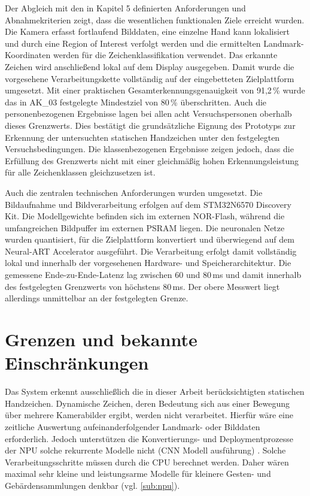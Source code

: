 Der Abgleich mit den in Kapitel 5 definierten Anforderungen und Abnahmekriterien zeigt, dass die wesentlichen funktionalen Ziele erreicht wurden. Die Kamera erfasst fortlaufend Bilddaten, eine einzelne Hand kann lokalisiert und durch eine Region of Interest verfolgt werden und die ermittelten Landmark-Koordinaten werden für die Zeichenklassifikation verwendet. Das erkannte Zeichen wird anschließend lokal auf dem Display ausgegeben. Damit wurde die vorgesehene Verarbeitungskette vollständig auf der eingebetteten Zielplattform umgesetzt. Mit einer praktischen Gesamterkennungsgenauigkeit von 91,2\,\% wurde das in AK\_03 festgelegte Mindestziel von 80\,\% überschritten. Auch die personenbezogenen Ergebnisse lagen bei allen acht Versuchspersonen oberhalb dieses Grenzwerts. Dies bestätigt die grundsätzliche Eignung des Prototyps zur Erkennung der untersuchten statischen Handzeichen unter den festgelegten Versuchsbedingungen. Die klassenbezogenen Ergebnisse zeigen jedoch, dass die Erfüllung des Grenzwerts nicht mit einer gleichmäßig hohen Erkennungsleistung für alle Zeichenklassen gleichzusetzen ist.

Auch die zentralen technischen Anforderungen wurden umgesetzt. Die Bildaufnahme und Bildverarbeitung erfolgen auf dem STM32N6570 Discovery Kit. Die Modellgewichte befinden sich im externen NOR-Flash, während die umfangreichen Bildpuffer im externen PSRAM liegen. Die neuronalen Netze wurden quantisiert, für die Zielplattform konvertiert und überwiegend auf dem Neural-ART Accelerator ausgeführt. Die Verarbeitung erfolgt damit vollständig lokal und innerhalb der vorgesehenen Hardware- und Speicherarchitektur. Die gemessene Ende-zu-Ende-Latenz lag zwischen 60 und 80\,ms und damit innerhalb des festgelegten Grenzwerts von höchstens 80\,ms. Der obere Messwert liegt allerdings unmittelbar an der festgelegten Grenze.

\section{Grenzen und bekannte Einschränkungen}\label{sec:grenzen}

Das System erkennt ausschließlich die in dieser Arbeit berücksichtigten statischen Handzeichen. Dynamische Zeichen, deren Bedeutung sich aus einer Bewegung über mehrere Kamerabilder ergibt, werden nicht verarbeitet. Hierfür wäre eine zeitliche Auswertung aufeinanderfolgender Landmark- oder Bilddaten erforderlich. Jedoch unterstützen die Konvertierungs- und Deploymentprozesse der NPU solche rekurrente Modelle nicht (CNN Modell ausführung) \cite{STNeuralARTNPU}. Solche Verarbeitungsschritte müssen durch die CPU berechnet werden. Daher wären maximal sehr kleine und leistungsarme Modelle für kleinere Gesten- und Gebärdensammlungen denkbar (vgl. \ref{sub:npu}).


